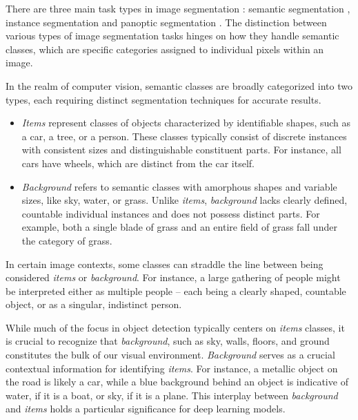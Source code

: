 There are three main task types in image segmentation \cite{IBM}: semantic segmentation \cite{SemanticSegmentationGuo2022},
instance segmentation \cite{yanYolo2023} and panoptic
segmentation \cite{mohan2020efficientps}.
The distinction between various types of image segmentation tasks hinges on how they handle semantic classes, which are specific categories assigned to individual pixels within an image.

In the realm of computer vision, semantic classes are broadly categorized into two types, each requiring distinct segmentation techniques for accurate results.
\begin{itemize}
  \item \textit{Items} represent classes of objects characterized by identifiable shapes, such as a car, \linebreak a tree, or a
  person. These classes typically consist of discrete instances with consistent sizes and distinguishable constituent parts. For instance, all cars have wheels, which are distinct from the car itself.
  \item \textit{Background} refers to semantic classes with amorphous shapes and variable sizes, like sky, water, or grass. Unlike \textit{items}, \textit{background} lacks clearly defined, countable individual instances and does not possess distinct parts. For example, both a single blade of grass and an entire field of grass fall under the category of grass.
\end{itemize}
In certain image contexts, some classes can straddle the line between being considered \textit{items} or \textit{
  background}. For instance, a large gathering of people might be interpreted either as multiple people -- each being
a clearly shaped, countable object, or as a singular, indistinct person.

While much of the focus in object detection typically centers on \textit{items} classes, it is crucial to recognize that \textit{background}, such as sky, walls, floors, and ground constitutes the bulk of our visual environment. \textit{Background} serves as a crucial contextual information for identifying \textit{items}. For instance, a metallic object on the road is likely a car, while \linebreak a blue background behind an object is indicative of water, if it is a boat, or sky, if it is \linebreak a plane. This interplay between \textit{background} and \textit{items} holds a particular significance for deep learning models.

